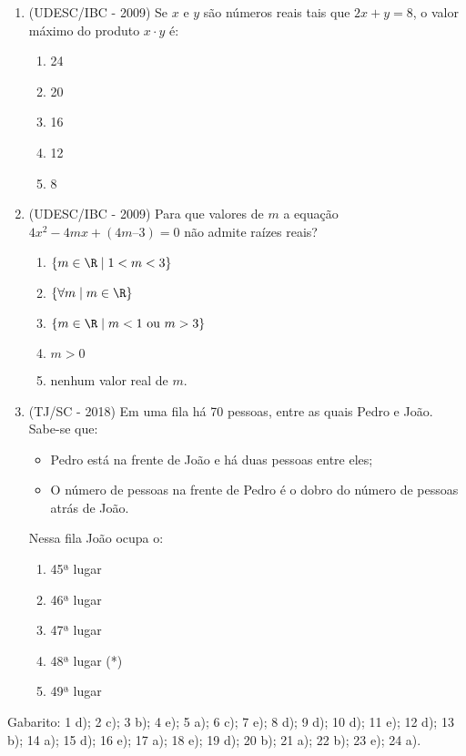 \begin{enumerate}
 \item (UDESC/IBC - 2009) Se $x$ e $y$ são números reais tais que $2x + y = 8$, o valor máximo do produto $x \cdot y$ é:
 \begin{enumerate}
 \item 24
 \item 20
 \item 16
 \item 12
 \item 8
 \end{enumerate}
 
 \item (UDESC/IBC - 2009) Para que valores de $m$ a equação $4x^2- 4mx + (4m – 3) = 0$ não admite raízes reais?
 \begin{enumerate}
 \item $\{m \in \R \mid 1< m < 3\}$
 \item $\{\forall m \mid m \in \R\}$
 \item $\{m \in \R \mid m < 1 \text{ ou } m > 3\}$
 \item $m > 0$
 \item nenhum valor real de $m$.
 \end{enumerate}
 
 \item (TJ/SC - 2018) Em uma fila há 70 pessoas, entre as quais Pedro e João. Sabe-se que:
  \begin{itemize}
   \item Pedro está na frente de João e há duas pessoas entre eles;
   \item O número de pessoas na frente de Pedro é o dobro do número de pessoas atrás de João.
  \end{itemize}
  Nessa fila João ocupa o:
  \begin{enumerate}
  \item 45ª lugar
  \item 46ª lugar
  \item 47ª lugar
  \item 48ª lugar (*)
  \item 49ª lugar
 \end{enumerate}
 
 \end{enumerate}
 
 Gabarito: 1 d); 2 c); 3 b); 4 e); 5 a); 6 c); 7 e); 8 d); 9 d); 10 d); 11 e); 12 d); 13 b); 14 a); 15 d); 16 e); 17 a); 18 e); 19 d); 20 b); 21 a); 22 b); 23 e); 24 a).
 
